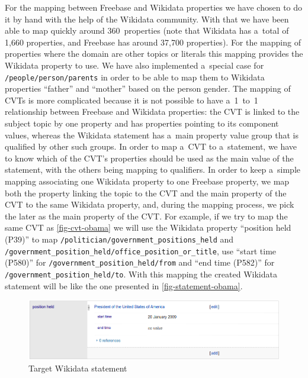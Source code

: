 \documentclass{sig-alternate}
\begin{document}
For the mapping between Freebase and Wikidata properties we have chosen to do it by hand
with the help of the Wikidata community.
With that we have been able to map quickly around 360~properties
(note that Wikidata has a~total of 1,660 properties, and Freebase has around 37,700 properties).
For the mapping of properties where the domain are other topics or literals
this mapping provides the Wikidata property to use.
We have also implemented a~special case for \texttt{/people/person/parents}
in order to be able to map them to Wikidata properties ``father'' and ``mother''
based on the person gender.
The mapping of CVTs is more complicated because it is not possible to have a~1~to~1 relationship
between Freebase and Wikidata properties: the CVT is linked to the subject topic by one property
and has properties pointing to its component values, whereas the Wikidata statement
has a~main property value group that is qualified by other such groups.
In order to map a~CVT to a~statement, we have to know which of the CVT's properties
should be used as the main value of the statement, with the others being mapping to qualifiers.
In order to keep a~simple mapping associating one Wikidata property to one Freebase property,
we map both the property linking the topic to the CVT
and the main property of the CVT to the same Wikidata property, and, during the mapping process,
we pick the later as the main property of the CVT.
For example, if we try to map the same CVT as \autoref{fig-cvt-obama}
we will use the Wikidata property ``position held (P39)'' to map
\texttt{/politician/government\_positions\_held} and
\texttt{/government\_position\_held/office\_position\_or\_title}, use ``start time (P580)''
for \texttt{/government\_position\_held/from} and ``end time (P582)'' for
\texttt{/government\_position\_held/to}.
With this mapping the created Wikidata statement will be
like the one presented in \autoref{fig-statement-obama}.

\begin{figure}[!htbp]
\centering
\includegraphics[width=8.45 cm]{img/wikidata-statement-obama.png}
\caption{Target Wikidata statement}
\label{fig-statement-obama}
\end{figure}
\end{document}
